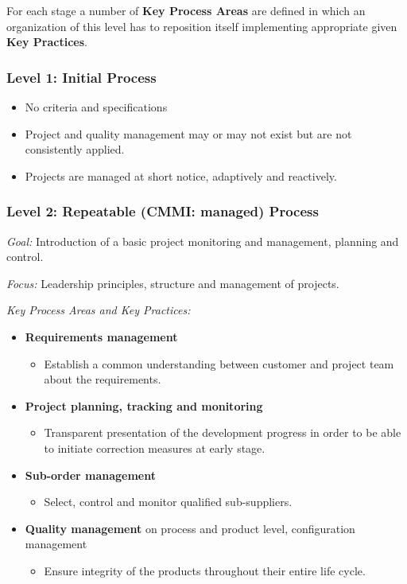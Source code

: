 \documentclass[11pt,a4paper]{article}
\begin{document}
For each stage a number of \textbf {Key Process Areas} are defined in which an
organization of this level has to reposition itself implementing appropriate
given \textbf {Key Practices}.

\subsubsection*{Level 1: Initial Process}
\begin {itemize} 
\item No criteria and specifications
\item Project and quality management may or may not exist but are not 
  consistently applied.
\item Projects are managed at short notice, adaptively and reactively.
\end {itemize}

\subsubsection*{Level 2: Repeatable (CMMI: managed) Process}

\emph {Goal:} Introduction of a basic project monitoring and management,
planning and control.
  
\emph {Focus:} Leadership principles, structure and management of projects.

\emph {Key Process Areas and Key Practices:}
\begin {itemize} 
\item \textbf {Requirements management}
  \begin {itemize} 
  \item Establish a common understanding between customer and project team
    about the requirements.
  \end {itemize}
\item \textbf {Project planning, tracking and monitoring}
  \begin {itemize} 
  \item Transparent presentation of the development progress in order to be
    able to initiate correction measures at early stage.
  \end {itemize}
\item \textbf {Sub-order management}
  \begin {itemize} 
  \item Select, control and monitor qualified sub-suppliers.
  \end {itemize}
\item \textbf {Quality management} on process and product level, configuration
  management
  \begin {itemize} 
  \item Ensure integrity of the products throughout their entire life cycle.
  \end {itemize}
\end {itemize}
\end{document}
